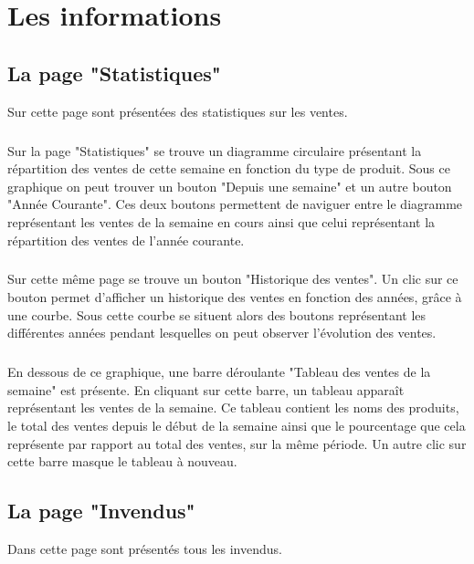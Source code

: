 \chapter{Les informations}

\section{La page "Statistiques"}
Sur cette page sont présentées des statistiques sur les ventes.

\paragraph{}
Sur la page "Statistiques" se trouve un diagramme circulaire présentant la 
répartition des ventes de cette semaine en fonction du type de produit. Sous 
ce graphique on peut trouver un bouton "Depuis une semaine" et un autre bouton 
"Année Courante". Ces deux boutons permettent de naviguer entre le diagramme 
représentant les ventes de la semaine en cours ainsi que celui représentant la 
répartition des ventes de l'année courante.

\paragraph{}
Sur cette même page se trouve un bouton "Historique des ventes". Un clic sur ce 
bouton permet d'afficher un historique des ventes en fonction des années, 
grâce à une courbe. Sous cette courbe se situent alors des boutons représentant 
les différentes années pendant lesquelles on peut observer l'évolution des ventes.

\paragraph{}
En dessous de ce graphique, une barre déroulante "Tableau des ventes de la 
semaine" est présente. En cliquant sur cette barre, un tableau apparaît 
représentant les ventes de la semaine. Ce tableau contient les noms des 
produits, le total des ventes depuis le début de la semaine ainsi que le 
pourcentage que cela représente par rapport au total des ventes, sur la même 
période. Un autre clic sur cette barre masque le tableau à nouveau.



\section{La page "Invendus"}
Dans cette page sont présentés tous les invendus.

